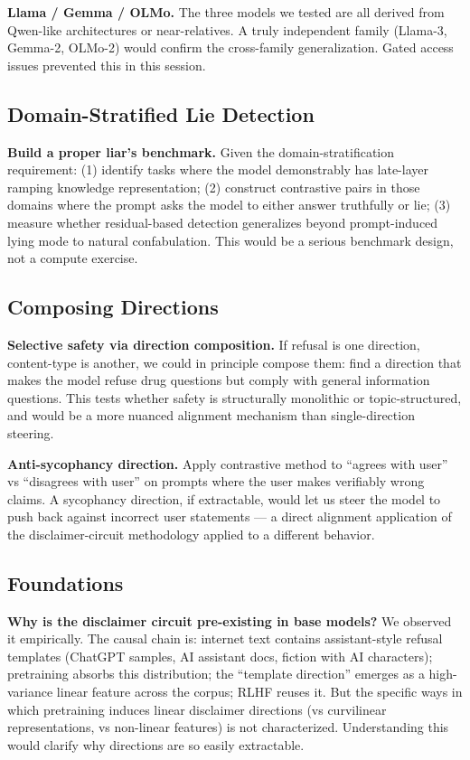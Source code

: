 \documentclass[11pt,a4paper]{article}
\begin{document}
\textbf{Llama / Gemma / OLMo.} The three models we tested are all derived from Qwen-like architectures or near-relatives. A truly independent family (Llama-3, Gemma-2, OLMo-2) would confirm the cross-family generalization. Gated access issues prevented this in this session.

\subsection{Domain-Stratified Lie Detection}

\textbf{Build a proper liar's benchmark.} Given the domain-stratification requirement: (1) identify tasks where the model demonstrably has late-layer ramping knowledge representation; (2) construct contrastive pairs in those domains where the prompt asks the model to either answer truthfully or lie; (3) measure whether residual-based detection generalizes beyond prompt-induced lying mode to natural confabulation. This would be a serious benchmark design, not a compute exercise.

\subsection{Composing Directions}

\textbf{Selective safety via direction composition.} If refusal is one direction, content-type is another, we could in principle compose them: find a direction that makes the model refuse drug questions but comply with general information questions. This tests whether safety is structurally monolithic or topic-structured, and would be a more nuanced alignment mechanism than single-direction steering.

\textbf{Anti-sycophancy direction.} Apply contrastive method to ``agrees with user'' vs ``disagrees with user'' on prompts where the user makes verifiably wrong claims. A sycophancy direction, if extractable, would let us steer the model to push back against incorrect user statements --- a direct alignment application of the disclaimer-circuit methodology applied to a different behavior.

\subsection{Foundations}

\textbf{Why is the disclaimer circuit pre-existing in base models?} We observed it empirically. The causal chain is: internet text contains assistant-style refusal templates (ChatGPT samples, AI assistant docs, fiction with AI characters); pretraining absorbs this distribution; the ``template direction'' emerges as a high-variance linear feature across the corpus; RLHF reuses it. But the specific ways in which pretraining induces linear disclaimer directions (vs curvilinear representations, vs non-linear features) is not characterized. Understanding this would clarify why directions are so easily extractable.
\end{document}
